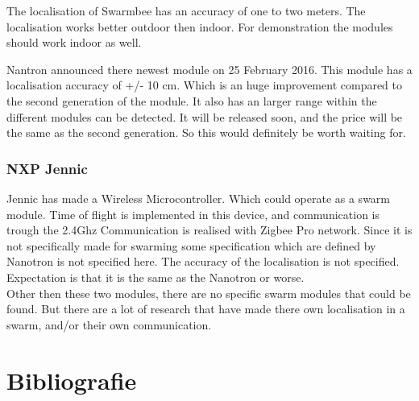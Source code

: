 \documentclass[10pt,a4paper]{article}
\begin{document}
The localisation of Swarmbee has an accuracy of one to two meters. The localisation works better outdoor then indoor. For demonstration the modules should work indoor as well. \cite{etotaal}

Nantron announced there newest module on 25 February 2016. This module has a localisation accuracy of +/- 10 cm. Which is an huge improvement compared to the second generation of the module. It also has an larger range within the different modules can be detected. It will be released soon, and the price will be the same as the second generation. So this would definitely be worth waiting for. \cite{nanotron}
	
\subsubsection{NXP Jennic} 

Jennic has made a Wireless Microcontroller. Which could operate as a swarm module. Time of flight is implemented in this device, and communication is trough the 2.4Ghz Communication is realised with Zigbee Pro network. Since it is not specifically made for swarming some specification which are defined by Nanotron is not specified here. The accuracy of the localisation is not specified. Expectation is that it is the same as the Nanotron or worse. \cite{wirelessmicrocontroller}\\

Other then these two modules, there are no specific swarm modules that could be found. But there are a lot of research that have made there own localisation in a swarm, and/or their own communication. 





\section{Bibliografie}


\end{document}
